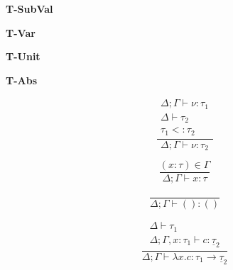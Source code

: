 \documentclass[12pt]{article}
\newcommand\ty[0]{\tau}
\newcommand\tunit[0]{()}
\newcommand\tarr[2]{#1 \rightarrow #2}
\newcommand\cty[0]{\underline{\ty}}
\newcommand\val[0]{\nu}
\newcommand\vunit[0]{()}
\newcommand\vabs[2]{\lambda #1 . #2}
\newcommand\comp[0]{c}
\newcommand\subty[2]{#1 <: #2}
\begin{document}
\begin{minipage}{0.25\textwidth}
\textbf{T-SubVal}
\end{minipage}
\begin{minipage}{0.25\textwidth}
\textbf{T-Var}
\end{minipage}
\begin{minipage}{0.25\textwidth}
\textbf{T-Unit}
\end{minipage}
\begin{minipage}{0.25\textwidth}
\textbf{T-Abs}
\end{minipage}

\begin{minipage}{0.25\textwidth}
\[\frac{
	\begin{array}{l}
	\Delta;\Gamma \vdash \val : \ty_1 \\
	\Delta \vdash \ty_2 \\
	\subty{\ty_1}{\ty_2}
	\end{array}
}{
	\Delta;\Gamma \vdash \val : \ty_2
}\]
\end{minipage}
\begin{minipage}{0.25\textwidth}
\[\frac{
	(x:\ty) \in \Gamma
}{
	\Delta;\Gamma \vdash x : \ty
}\]
\end{minipage}
\begin{minipage}{0.25\textwidth}
\[\frac{
}{
	\Delta;\Gamma \vdash \vunit : \tunit
}\]
\end{minipage}
\begin{minipage}{0.25\textwidth}
\[\frac{
	\begin{array}{l}
	\Delta \vdash \ty_1 \\
	\Delta;\Gamma, x : \ty_1 \vdash \comp : \cty_2
	\end{array}
}{
	\Delta;\Gamma \vdash \vabs{x}{\comp} : \tarr{\ty_1}{\cty_2}
}\]
\end{minipage}
\end{document}
